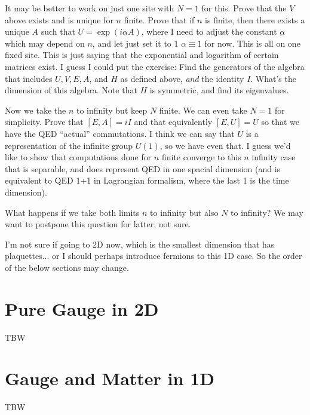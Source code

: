 	It may be better to work on just one site with $N=1$ for this. Prove that the $V$ above exists and is unique for $n$ finite.
	Prove that if $n$ is finite, then there exists a unique $A$ such that $U=\exp(i \alpha A)$, where I need to adjust the constant $\alpha$ which
	may depend on $n$, and let just set it to 1 $\alpha\equiv1$ for now. This is all on one fixed site.
	This is just saying that the exponential and logarithm of certain matrices exist.
	I guess I could put the exercise: Find the generators of the algebra that includes $U, V, E, A$,  and $H$ as defined above, \emph{and} the identity $I$.
	What's the dimension of this algebra. Note that $H$ is symmetric, and find its eigenvalues.

	Now we take the $n$ to infinity but keep $N$ finite. We can even take $N=1$ for simplicity.
	Prove that  $[E, A] = iI$ and that equivalently $[E, U]= U$ so that we have the QED ``actual'' commutations.
	I think we can say that $U$ is a representation of the infinite group $U(1)$, so we have even that.
	I guess we'd like to show that computations done for $n$ finite converge to this $n$ infinity case that is separable, and does
	represent QED in one spacial dimension (and is equivalent to QED 1+1 in Lagrangian formalism, where the last 1 is the time dimension).

	What happens if we take both limits $n$ to infinity but also $N$ to infinity? We may want to postpone this question for latter, not sure.

	I'm not sure if going to 2D now, which is the smallest dimension that has plaquettes... or I should perhaps introduce fermions to this 1D case.
	So the order of the below sections may change.


	\section{Pure Gauge in 2D}
	TBW
	\section{Gauge and Matter in 1D}
	TBW

%
